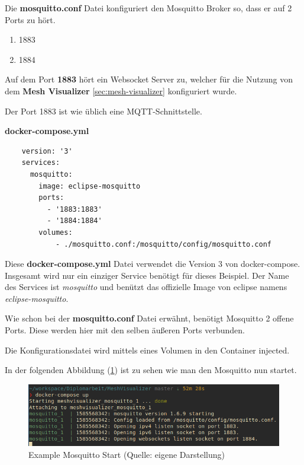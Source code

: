 Die \textbf{mosquitto.conf} Datei konfiguriert den Mosquitto Broker so, dass er auf 2 Ports zu hört.

\begin{enumerate}
    \item 1883
    \item 1884
\end{enumerate}

Auf dem Port \textbf{1883} hört ein Websocket Server zu, welcher für die Nutzung von dem \textbf{Mesh Visualizer} \ref{sec:mesh-visualizer} konfiguriert wurde. 

Der Port 1883 ist wie üblich eine MQTT-Schnittstelle.

\textbf{docker-compose.yml}
\begin{verbatim}
    version: '3'
    services:
      mosquitto:
        image: eclipse-mosquitto
        ports:
          - '1883:1883'
          - '1884:1884'
        volumes:
            - ./mosquitto.conf:/mosquitto/config/mosquitto.conf
\end{verbatim}
\vspace*{10px}

Diese \textbf{docker-compose.yml} Datei verwendet die Version 3 von docker-compose. Insgesamt wird nur ein einziger Service benötigt für dieses Beispiel. Der Name des Services ist \textit{mosquitto} und benützt das offizielle Image von eclipse namens \textit{eclipse-mosquitto}.

Wie schon bei der \textbf{mosquitto.conf} Datei erwähnt, benötigt Mosquitto 2 offene Ports. Diese werden hier mit den selben äußeren Ports verbunden.

Die Konfigurationsdatei wird mittels eines Volumen in den Container injected.

In der folgenden Abbildung (\ref{abb:example_mosquitto_start}) ist zu sehen wie man den Mosquitto nun startet.

\begin{figure}[H]
    \begin{center}
        \includegraphics[scale=0.8]{images/example_mosquitto_start.png}
        \caption{Example Mosquitto Start (Quelle: eigene Darstellung)}
        \label{abb:example_mosquitto_start}
    \end{center}
\end{figure}

